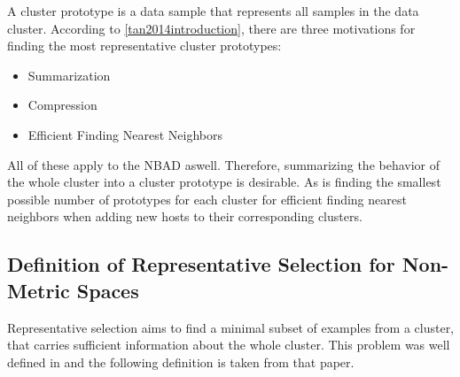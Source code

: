 \documentclass[thesis=B,english]{FITthesis}[2012/10/20]
\begin{document}
A cluster prototype is a data sample that represents all samples in the data cluster.
According to \ref{tan2014introduction}, there are three motivations for finding the most representative cluster prototypes:
\begin{itemize}
    \item Summarization
    \item Compression
    \item Efficient Finding Nearest Neighbors
\end{itemize}
All of these apply to the NBAD aswell.
Therefore, summarizing the behavior of the whole cluster into a cluster prototype is desirable.
As is finding the smallest possible number of prototypes for each cluster for efficient finding nearest neighbors when adding new hosts to their corresponding clusters.

\subsection{Definition of Representative Selection for Non-Metric Spaces}\label{sec:def_rep_selection}
Representative selection aims to find a minimal subset of examples from a cluster, that carries sufficient information about the whole cluster.
This problem was well defined in \cite{liebman2015representative} and the following definition is taken from that paper.
\end{document}
